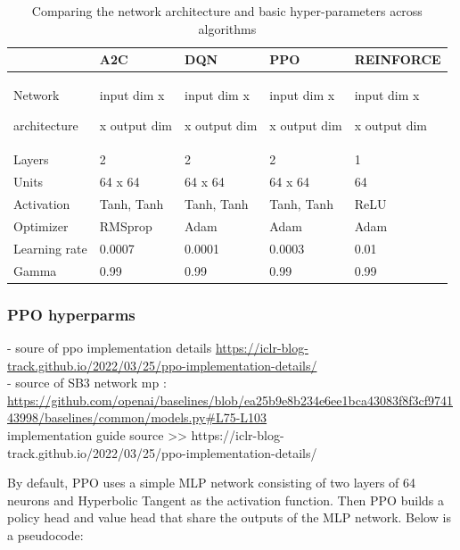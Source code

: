 \documentclass[a4paper, 12pt]{article}
\newcommand{\rowspace}[1]{\renewcommand{\arraystretch}{#1}}
\begin{document}
\begin{table}\centering
	\sffamily
	\rowspace{1.5}
	\begin{tabular}{L{2cm} R{2.5cm} R{2.5cm} R{2.5cm} R{3cm}}
		\toprule
		&\textbf{A2C}&\textbf{DQN}&\textbf{PPO}&\textbf{REINFORCE}\\ \midrule
		
		Network\par architecture&input dim x\par [64|Tanh x 64|Tanh]\par x output dim&input dim x\par [64|Tanh x 64|Tanh]\par x output dim&input dim x\par [64|Tanh x 64|Tanh]\par x output dim&input dim x\par [64|ReLU]\par x output dim\\
		Layers&2&2&2&1\\
		Units&64  x 64&64  x 64&64  x 64&64\\
		Activation&Tanh, Tanh&Tanh, Tanh&Tanh, Tanh&ReLU\\
		Optimizer&RMSprop&Adam&Adam&Adam\\ \midrule
		Learning rate&0.0007&0.0001&0.0003&0.01\\
		Gamma&0.99&0.99&0.99&0.99\\			
		\bottomrule
	\end{tabular}
	\caption{Comparing the network architecture and basic hyper-parameters across algorithms}
	\label{tbl:network-architecture}
\end{table}

\subsubsection{PPO hyperparms}
- soure of ppo implementation details \url{https://iclr-blog-track.github.io/2022/03/25/ppo-implementation-details/}\\
- source of SB3 network mp : \url{https://github.com/openai/baselines/blob/ea25b9e8b234e6ee1bca43083f8f3cf974143998/baselines/common/models.py#L75-L103}\\
implementation guide source >> https://iclr-blog-track.github.io/2022/03/25/ppo-implementation-details/

By default, PPO uses a simple MLP network consisting of two layers of 64 neurons and Hyperbolic Tangent as the activation function. Then PPO builds a policy head and value head that share the outputs of the MLP network. Below is a pseudocode:
\end{document}

